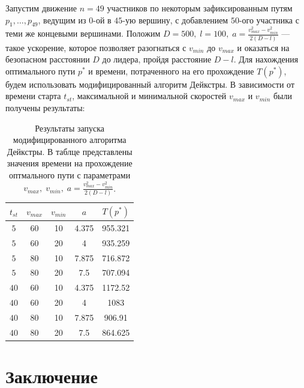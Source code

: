 \documentclass[12pt, a4paper]{article}
\begin{document}
Запустим движение $n = 49$ участников по некоторым зафиксированным путям $p_1, \dots, p_{49}$, ведущим из $0$-ой в $45$-ую вершину, с добавлением $50$-ого участника с теми же концевыми вершинами. Положим $D = 500, \; l = 100, \; a = \frac{v^2_{max}-v^2_{min}}{2(D-l)}$ --- такое ускорение, которое позволяет разогнаться с $v_{min}$ до $v_{max}$ и оказаться на безопасном расстоянии $D$ до лидера, пройдя расстояние $D-l$. Для нахождения оптимального пути $p^*$ и времени, потраченного на его прохождение $T(p^*)$, будем использовать модифицированный алгоритм Дейкстры. В зависимости от времени старта $t_{st}$, максимальной и минимальной скоростей $v_{max}$ и $v_{min}$ были получены результаты:

\begin{table}[H]
	\label{tab:res_average}
	\centering
	\begin{tabular}{|c|c|c|c|c|}
		\hline
		\multicolumn{1}{|c|}{ $t_{st}$} & $v_{max}$  & $v_{min}$ & $a$ &  $T(p^*)$ \\ \hline
		\multicolumn{1}{|c|}{$5$}       & 60         & 10        & 4.375 &   955.321         \\ \hline
		\multicolumn{1}{|c|}{$5$}       & 60         & 20        &  4   &     935.259        \\ \hline
		\multicolumn{1}{|c|}{$5$ }      & 80         & 10        &  7.875   &    716.872         \\ \hline
		\multicolumn{1}{|c|}{$5$}       & 80 & 20                  & 7.5 &        707.094           \\ \hline
		\multicolumn{1}{|c|}{$40$}      & 60 & 10                  & 4.375    &  1172.52            \\ \hline
		\multicolumn{1}{|c|}{$40$ }     & 60 & 20                  & 4   &       1083       \\ \hline
		\multicolumn{1}{|c|}{$40$}      & 80 & 10                  & 7.875    &    906.91          \\ \hline
		\multicolumn{1}{|c|}{$40$ }     & 80 & 20                  & 7.5   &       864.625       \\ \hline
		
	\end{tabular}
	\caption{Результаты запуска модифицированного алгоритма Дейкстры. В таблце представлены значения времени на прохождение оптмального пути с параметрами $v_{max}, \; v_{min}, \; a = \frac{v^2_{max}-v^2_{min}}{2(D-l)}$.}
\end{table}

\fi
\newpage
\section*{Заключение}
\end{document}
